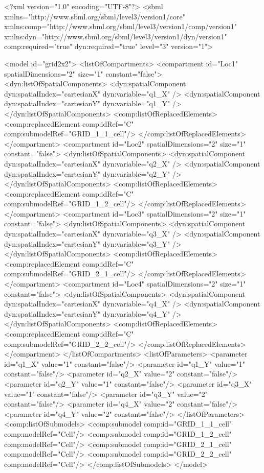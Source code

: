 \begin{example}
<?xml version="1.0" encoding="UTF-8"?>
	<sbml xmlns="http://www.sbml.org/sbml/level3/version1/core" 
		  xmlns:comp="http://www.sbml.org/sbml/level3/version1/comp/version1"
		  xmlns:dyn="http://www.sbml.org/sbml/level3/version1/dyn/version1"
		  comp:required="true" dyn:required="true" level="3" version="1">

	<model id="grid2x2">
		<listOfCompartments>
			<compartment id="Loc1" spatialDimensions="2" size="1" constant="false">
				<dyn:listOfSpatialComponents>
					<dyn:spatialComponent dyn:spatialIndex="cartesianX" dyn:variable="q1_X" />
					<dyn:spatialComponent dyn:spatialIndex="cartesianY" dyn:variable="q1_Y" />
				</dyn:listOfSpatialComponents>
				<comp:listOfReplacedElements>
					<comp:replacedElement comp:idRef="C" comp:submodelRef="GRID_1_1_cell"/>
				</comp:listOfReplacedElements>
			</compartment>	
			<compartment id="Loc2" spatialDimensions="2" size="1" constant="false">
				<dyn:listOfSpatialComponents>
					<dyn:spatialComponent dyn:spatialIndex="cartesianX" dyn:variable="q2_X" />
					<dyn:spatialComponent dyn:spatialIndex="cartesianY" dyn:variable="q2_Y" />
				</dyn:listOfSpatialComponents>
				<comp:listOfReplacedElements>
					<comp:replacedElement comp:idRef="C" comp:submodelRef="GRID_1_2_cell"/>
				</comp:listOfReplacedElements>
			</compartment>	
			<compartment id="Loc3" spatialDimensions="2" size="1" constant="false">
				<dyn:listOfSpatialComponents>
					<dyn:spatialComponent dyn:spatialIndex="cartesianX" dyn:variable="q3_X" />
					<dyn:spatialComponent dyn:spatialIndex="cartesianY" dyn:variable="q3_Y" />
				</dyn:listOfSpatialComponents>
				<comp:listOfReplacedElements>
					<comp:replacedElement comp:idRef="C" comp:submodelRef="GRID_2_1_cell"/>
				</comp:listOfReplacedElements>
			</compartment>	
			<compartment id="Loc4" spatialDimensions="2" size="1" constant="false">
				<dyn:listOfSpatialComponents>
					<dyn:spatialComponent dyn:spatialIndex="cartesianX" dyn:variable="q4_X" />
					<dyn:spatialComponent dyn:spatialIndex="cartesianY" dyn:variable="q4_Y" />
				</dyn:listOfSpatialComponents>
				<comp:listOfReplacedElements>
					<comp:replacedElement comp:idRef="C" comp:submodelRef="GRID_2_2_cell"/>
				</comp:listOfReplacedElements>
			</compartment>	
		</listOfCompartments>
		<listOfParameters>
			<parameter id="q1_X" value="1" constant="false"/>
			<parameter id="q1_Y"  value="1" constant="false"/>
			<parameter id="q2_X" value="2" constant="false"/>
			<parameter id="q2_Y"  value="1" constant="false"/>
			<parameter id="q3_X" value="1" constant="false"/>
			<parameter id="q3_Y"  value="2" constant="false"/>
			<parameter id="q4_X" value="2" constant="false"/>
			<parameter id="q4_Y"  value="2" constant="false"/>
		</listOfParameters>
		<comp:listOfSubmodels>
			<comp:submodel comp:id="GRID_1_1_cell" comp:modelRef="Cell"/>
			<comp:submodel comp:id="GRID_1_2_cell" comp:modelRef="Cell"/>
			<comp:submodel comp:id="GRID_2_1_cell" comp:modelRef="Cell"/>
			<comp:submodel comp:id="GRID_2_2_cell" comp:modelRef="Cell"/>
		</comp:listOfSubmodels>
	</model>


\end{example}
